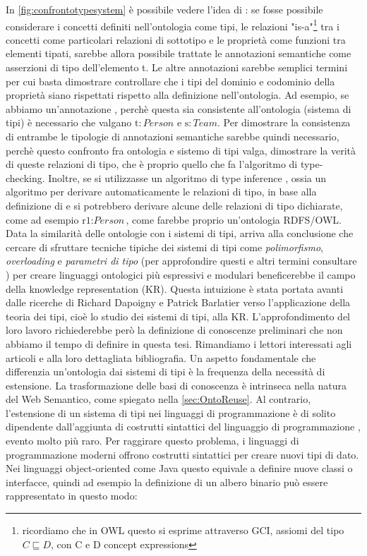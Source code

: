 In \autoref{fig:confrontotypesystem} è possibile vedere l'idea di \cite{despeyroux2008evolution}: se fosse possibile considerare i concetti definiti nell'ontologia come tipi, le relazioni "is-a"\footnote{ricordiamo che in OWL questo si esprime attraverso GCI, assiomi del tipo $C \sqsubseteq D$, con C e D concept expressions} tra i concetti come particolari relazioni di sottotipo e le proprietà come funzioni tra elementi tipati, sarebbe allora possibile trattate le annotazioni semantiche  come asserzioni di tipo dell'elemento t. Le altre annotazioni sarebbe semplici termini per cui basta dimostrare controllare che i tipi del dominio e codominio della proprietà siano rispettati rispetto alla definizione nell'ontologia. Ad esempio, se abbiamo un'annotazione , perchè questa sia consistente all'ontologia (sistema di tipi) è necessario che valgano $\text{t}: Person$ e $\text{s}: Team$. Per dimostrare la consistenza di entrambe le tipologie di annotazioni semantiche sarebbe quindi necessario, perchè questo confronto fra ontologia e sistemo di tipi valga, dimostrare la verità di queste relazioni di tipo, che è proprio quello che fa l'algoritmo di type-checking. Inoltre, se si utilizzasse un algoritmo di type inference \cite{cardoneTypeInference, martellimontanaritypeinference}, ossia un algoritmo per derivare automaticamente le  relazioni di tipo, in base alla definizione di  e  si potrebbero derivare alcune delle relazioni di tipo dichiarate, come ad esempio $\text{r1} : \textit{Person}$, come farebbe proprio un'ontologia RDFS/OWL.\\
Data la similarità delle ontologie con i sistemi di tipi, \cite{despeyroux2008evolution} arriva alla conclusione che cercare di sfruttare tecniche tipiche dei sistemi di tipi come \textit{polimorfismo}, \textit{overloading} e \textit{parametri di tipo} (per approfondire questi e altri termini consultare \cite{pierceTypesBook}) per creare linguaggi ontologici più espressivi e modulari beneficerebbe il campo della knowledge representation (KR). Questa intuizione è stata portata avanti dalle ricerche di Richard Dapoigny e Patrick Barlatier verso l'applicazione della teoria dei tipi, cioè lo studio dei sistemi di tipi, alla KR. L'approfondimento del loro lavoro richiederebbe però la definizione di conoscenze preliminari che non abbiamo il tempo di definire in questa tesi. Rimandiamo i lettori interessati agli articoli \cite{dapoigny2011typetheoryKR, dapoigny2012typetheoryKR} e alla loro dettagliata bibliografia.
Un aspetto fondamentale che differenzia un'ontologia dai sistemi di tipi è la frequenza della necessità di estensione. La trasformazione delle basi di conoscenza è intrinseca nella natura del Web Semantico, come spiegato nella \autoref{sec:OntoReuse}. Al contrario, l'estensione di un sistema di tipi nei linguaggi di programmazione è di solito dipendente dall'aggiunta di costrutti sintattici del linguaggio di programmazione \cite{pierceTypesBook}, evento molto più raro. Per raggirare questo problema, i linguaggi di programmazione moderni offrono costrutti sintattici per creare nuovi tipi di dato. Nei linguaggi object-oriented come Java questo equivale a definire nuove classi o interfacce, quindi ad esempio la definizione di un albero binario può essere rappresentato in questo modo:
